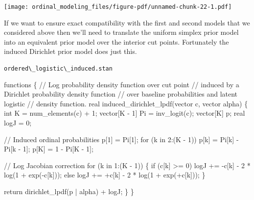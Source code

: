 \documentclass[
  letterpaper,
  DIV=11,
  numbers=noendperiod]{scrartcl}
\newenvironment{Shaded}{\begin{snugshade}}{\end{snugshade}}
\newcommand{\CommentTok}[1]{\textcolor[rgb]{0.37,0.37,0.37}{#1}}
\newcommand{\ControlFlowTok}[1]{\textcolor[rgb]{0.00,0.23,0.31}{#1}}
\newcommand{\DataTypeTok}[1]{\textcolor[rgb]{0.68,0.00,0.00}{#1}}
\newcommand{\DecValTok}[1]{\textcolor[rgb]{0.68,0.00,0.00}{#1}}
\newcommand{\KeywordTok}[1]{\textcolor[rgb]{0.00,0.23,0.31}{#1}}
\newcommand{\NormalTok}[1]{\textcolor[rgb]{0.00,0.23,0.31}{#1}}
\begin{document}
\texttt{[image: ordinal\_modeling\_files/figure-pdf/unnamed-chunk-22-1.pdf]}

If we want to ensure exact compatibility with the first and second
models that we considered above then we'll need to translate the uniform
simplex prior model into an equivalent prior model over the interior cut
points. Fortunately the induced Dirichlet prior model does just this.

\begin{codelisting}

\caption{\texttt{ordered\textbackslash\_logistic\textbackslash\_induced.stan}}

\begin{Shaded}
\begin{Highlighting}[]
\KeywordTok{functions}\NormalTok{ \{}
  \CommentTok{// Log probability density function over cut point}
  \CommentTok{// induced by a Dirichlet probability density function}
  \CommentTok{// over baseline probabilities and latent logistic}
  \CommentTok{// density function.}
  \DataTypeTok{real}\NormalTok{ induced\_dirichlet\_lpdf(}\DataTypeTok{vector}\NormalTok{ c, }\DataTypeTok{vector}\NormalTok{ alpha) \{}
    \DataTypeTok{int}\NormalTok{ K = num\_elements(c) + }\DecValTok{1}\NormalTok{;}
    \DataTypeTok{vector}\NormalTok{[K {-} }\DecValTok{1}\NormalTok{] Pi = inv\_logit(c);}
    \DataTypeTok{vector}\NormalTok{[K] p;}
    \DataTypeTok{real}\NormalTok{ logJ = }\DecValTok{0}\NormalTok{;}

    \CommentTok{// Induced ordinal probabilities}
\NormalTok{    p[}\DecValTok{1}\NormalTok{] = Pi[}\DecValTok{1}\NormalTok{];}
    \ControlFlowTok{for}\NormalTok{ (k }\ControlFlowTok{in} \DecValTok{2}\NormalTok{:(K {-} }\DecValTok{1}\NormalTok{))}
\NormalTok{      p[k] = Pi[k] {-} Pi[k {-} }\DecValTok{1}\NormalTok{];}
\NormalTok{    p[K] = }\DecValTok{1}\NormalTok{ {-} Pi[K {-} }\DecValTok{1}\NormalTok{];}

    \CommentTok{// Log Jacobian correction}
    \ControlFlowTok{for}\NormalTok{ (k }\ControlFlowTok{in} \DecValTok{1}\NormalTok{:(K {-} }\DecValTok{1}\NormalTok{)) \{}
      \ControlFlowTok{if}\NormalTok{ (c[k] \textgreater{}= }\DecValTok{0}\NormalTok{)}
\NormalTok{        logJ += {-}c[k] {-} }\DecValTok{2}\NormalTok{ * log(}\DecValTok{1}\NormalTok{ + exp({-}c[k]));}
      \ControlFlowTok{else}
\NormalTok{        logJ += +c[k] {-} }\DecValTok{2}\NormalTok{ * log(}\DecValTok{1}\NormalTok{ + exp(+c[k]));}
\NormalTok{    \}}

    \ControlFlowTok{return}\NormalTok{ dirichlet\_lpdf(p | alpha) + logJ;}
\NormalTok{  \}}
\NormalTok{\}}


\end{Highlighting}
\end{Shaded}
\end{codelisting}
\end{document}
